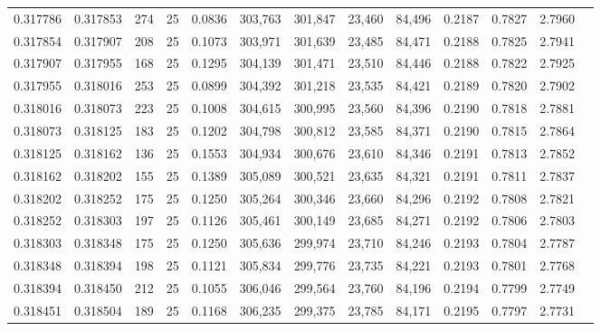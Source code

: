 \begin{tabular}{rrrrrrrrrrrrr}
0.317786 & 0.317853 &   274 &  25 &                                     0.0836 & 303,763 & 301,847 &  23,460 &  84,496 & 0.2187 & 0.7827 & 2.7960 \\
0.317854 & 0.317907 &   208 &  25 &                                     0.1073 & 303,971 & 301,639 &  23,485 &  84,471 & 0.2188 & 0.7825 & 2.7941 \\
0.317907 & 0.317955 &   168 &  25 &                                     0.1295 & 304,139 & 301,471 &  23,510 &  84,446 & 0.2188 & 0.7822 & 2.7925 \\
0.317955 & 0.318016 &   253 &  25 &                                     0.0899 & 304,392 & 301,218 &  23,535 &  84,421 & 0.2189 & 0.7820 & 2.7902 \\
0.318016 & 0.318073 &   223 &  25 &                                     0.1008 & 304,615 & 300,995 &  23,560 &  84,396 & 0.2190 & 0.7818 & 2.7881 \\
0.318073 & 0.318125 &   183 &  25 &                                     0.1202 & 304,798 & 300,812 &  23,585 &  84,371 & 0.2190 & 0.7815 & 2.7864 \\
0.318125 & 0.318162 &   136 &  25 &                                     0.1553 & 304,934 & 300,676 &  23,610 &  84,346 & 0.2191 & 0.7813 & 2.7852 \\
0.318162 & 0.318202 &   155 &  25 &                                     0.1389 & 305,089 & 300,521 &  23,635 &  84,321 & 0.2191 & 0.7811 & 2.7837 \\
0.318202 & 0.318252 &   175 &  25 &                                     0.1250 & 305,264 & 300,346 &  23,660 &  84,296 & 0.2192 & 0.7808 & 2.7821 \\
0.318252 & 0.318303 &   197 &  25 &                                     0.1126 & 305,461 & 300,149 &  23,685 &  84,271 & 0.2192 & 0.7806 & 2.7803 \\
0.318303 & 0.318348 &   175 &  25 &                                     0.1250 & 305,636 & 299,974 &  23,710 &  84,246 & 0.2193 & 0.7804 & 2.7787 \\
0.318348 & 0.318394 &   198 &  25 &                                     0.1121 & 305,834 & 299,776 &  23,735 &  84,221 & 0.2193 & 0.7801 & 2.7768 \\
0.318394 & 0.318450 &   212 &  25 &                                     0.1055 & 306,046 & 299,564 &  23,760 &  84,196 & 0.2194 & 0.7799 & 2.7749 \\
0.318451 & 0.318504 &   189 &  25 &                                     0.1168 & 306,235 & 299,375 &  23,785 &  84,171 & 0.2195 & 0.7797 & 2.7731 \\

\end{tabular}
